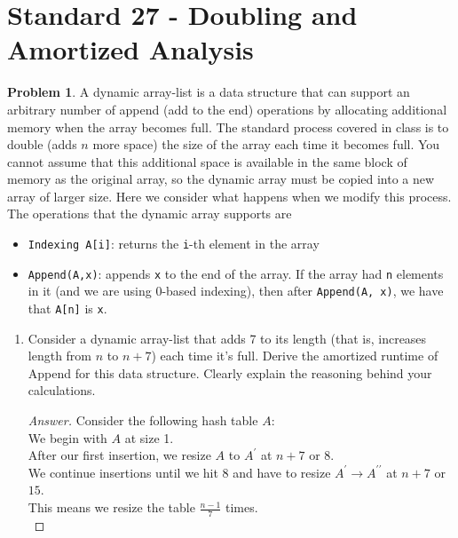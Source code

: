\documentclass[11pt]{article}
\theoremstyle{definition}
\theoremstyle{definition}
\newtheorem{required}{Problem}
\theoremstyle{definition}
\begin{document}
\section{Standard 27 - Doubling and Amortized Analysis}
\addtocounter{required}{1}
\begin{required}

A dynamic array-list is a data structure that can support an arbitrary number
    of append (add to the end) operations by allocating additional memory when
    the array becomes full. The standard process covered in class is to double (adds $n$ more
    space) the size of the array each time it becomes full. You cannot assume
    that this additional space is available in the same block of memory as the
    original array, so the dynamic array must be copied into a new array of
    larger size. Here we consider what happens when we modify this process. The
    operations that the dynamic array supports are 
\begin{itemize}
    \item {\tt Indexing A[i]}: returns the {\tt i}-th element in the array
    \item {\tt Append(A,x)}: appends {\tt x} to the end of the array.  If the
        array had {\tt n} elements in it (and we are using 0-based indexing),
        then after {\tt Append(A, x)}, we have that {\tt A[n]} is {\tt x}.
\end{itemize}

\renewcommand{\theenumi}{\alph{enumi}}
\begin{enumerate}
\subsection*{27(a)}

        \item \label{4c} Consider a dynamic array-list that adds 7 to its length (that is, increases length from $n$ to $n+7$) each time it's full. Derive the amortized runtime of Append for this data structure. Clearly explain the reasoning behind your calculations.
\begin{proof}[Answer]
    Consider the following hash table $A$:\\
    We begin with $A$ at size 1.\\
    After our first insertion, we resize $A$ to  $A^\prime$ at $n+7$ or $8$.\\
    We continue insertions until we hit $8$ and have to resize $A^\prime \to A^{\prime\prime}$ at $n + 7$ or $15$.\\
    This means we resize the table $\frac{n - 1}{7}$ times.\\
    

\end{proof}
\end{enumerate}
\end{required}
\end{document}
